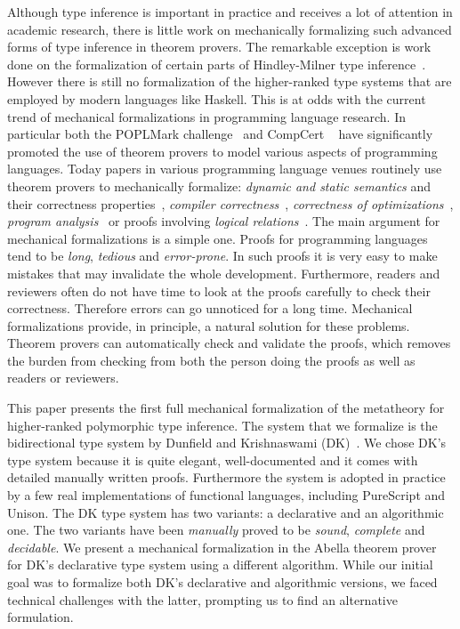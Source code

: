 Although type inference is important in practice and receives a lot of
attention in
academic research, there is little work on mechanically formalizing
such advanced forms of type inference in theorem provers.
The remarkable exception is work done on the formalization of 
certain parts of Hindley-Milner type inference~\cite{naraschewski1999type,
dubois2000proving,dubois1999certification,urban2008nominal,
garrigue2015certified}. However
there is still no formalization of the higher-ranked type systems
that are employed by modern languages like Haskell.
This is at
odds with the current trend of mechanical formalizations in
programming language research. In particular both the POPLMark
challenge~\cite{aydemir2005mechanized} and
CompCert ~\cite{leroy2012compcert} have significantly promoted
the use of theorem provers to model various aspects of programming
languages. Today papers in various programming language venues routinely
use theorem provers to mechanically formalize: \emph{dynamic and
  static semantics} and their correctness properties~\cite{aydemir2008engineering},
\emph{compiler correctness}~\cite{leroy2012compcert}, \emph{correctness of
  optimizations}~\cite{Bertot04}, \emph{program analysis}~\cite{Chang2006}
or proofs involving \emph{logical relations}~\cite{abel2018}. The
main argument for mechanical formalizations is a simple one. Proofs
for programming languages tend to be \emph{long}, \emph{tedious} and
\emph{error-prone}. In such proofs it is very easy to make mistakes
that may invalidate the whole development. Furthermore, readers and
reviewers often do not have time to look at the proofs carefully to
check their correctness. Therefore errors can go unnoticed for a
long time.  Mechanical formalizations provide, in principle, a natural
solution for these problems. Theorem provers can automatically check and
validate the proofs, which removes the burden from checking from both
the person doing the proofs as well as readers or reviewers.

This paper presents the first full mechanical formalization of the
metatheory for higher-ranked polymorphic type inference.
The system
that we formalize is the bidirectional type system by Dunfield and
Krishnaswami (DK)~\cite{dunfield2013complete}.
We chose DK's type system because it is
quite elegant, well-documented and it comes with detailed manually
written proofs. Furthermore the system is adopted in practice by a few
real implementations of functional languages, including PureScript and
Unison. The DK type system has two variants: a declarative
and an algorithmic one. The two variants have been
\emph{manually} proved to be \emph{sound}, \emph{complete} and
\emph{decidable}.
We present a mechanical formalization in the Abella theorem prover~\cite{AbellaDesc} for
DK's declarative type system using a different algorithm. While our
initial goal was to formalize both DK's declarative and algorithmic
versions, we faced technical challenges with the latter, prompting us to find
an alternative formulation.

